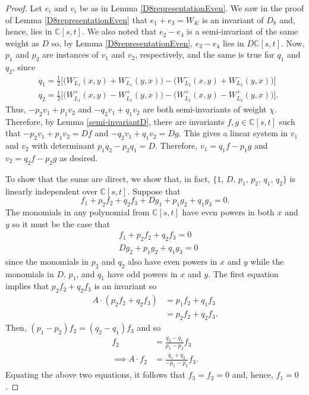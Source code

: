 \documentclass[a4paper,reqno]{amsart}
\theoremstyle{definition}
\theoremstyle{remark} \newtheorem{remark}[theorem]{Remark}
\numberwithin{equation}{section}
\begin{document}
\begin{proof}
    Let \(e_i\) and \(v_i\) be as in Lemma \ref{D8representationEven}. We saw in the proof of Lemma \ref{D8representationEven} that \(e_1 + e_3 = W_K\) is an invariant of \(D_8\) and, hence, lies in \(\mathbb{C}[s,t]\). We also noted that \(e_2 - e_4\) is a semi-invariant of the same weight as \(D\) so, by Lemma \ref{D8representationEven}, \(e_2 - e_4\) lies in \(D\mathbb{C}[s,t]\). Now, \(p_1\) and \(p_2\) are instances of \(v_1\) and \(v_2\), respectively, and the same is true for \(q_1\) and \(q_2\), since
    \begin{align*}
        &q_1 = \frac{1}{2}\biggl[\biggl(W_{L_1}^-(x,y) + W_{L_1}^-(y,x)\biggr) - \biggl(W_{L_2}^-(x,y) + W_{L_2}^-(y,x)\biggr)\biggr] \\
        &q_2 = \frac{1}{2}\biggl[\biggl(W_{L_1}^+(x,y) - W_{L_1}^+(y,x)\biggr) - \biggl(W_{L_2}^+(x,y) - W_{L_2}^+(y,x)\biggr)\biggr].
    \end{align*}
    Thus, \(-p_2v_1 + p_1v_2\) and \(-q_2v_1 + q_1v_2\) are both semi-invariants of weight \(\chi\). Therefore, by Lemma \ref{semi-invariantD}, there are invariants \(f,g \in \mathbb{C}[s,t]\) such that \(-p_2v_1 + p_1v_2 = Df\) and \(-q_2v_1 + q_1v_2 = Dg\). This gives a linear system in \(v_1\) and \(v_2\) with determinant \(p_1q_2 - p_2q_1 = D\). Therefore, \(v_1 = q_1f - p_1g\) and \(v_2 = q_2f - p_2g\) as desired.
    
    To show that the sums are direct, we show that, in fact, \(\{1,\, D,\, p_1,\, p_2,\, q_1,\, q_2\}\) is linearly independent over \(\mathbb{C}[s,t]\). Suppose that 
    \begin{equation*}
        f_1 + p_2f_2 + q_2f_3 + Dg_1 + p_1g_2 + q_1g_3 = 0. 
    \end{equation*}
    The monomials in any polynomial from \(\mathbb{C}[s,t]\) have even powers in both \(x\) and \(y\) so it must be the case that 
    \begin{align*}
        &f_1 + p_2f_2 + q_2f_3 = 0 \\
        &Dg_2 + p_1g_2 + q_1g_3 = 0
    \end{align*}
    since the monomials in \(p_2\) and \(q_2\) also have even powers in \(x\) and \(y\) while the monomials in \(D,\,p_1\), and \(q_1\) have odd powers in \(x\) and \(y\). The first equation implies that \(p_2f_2 + q_2f_3\) is an invariant so
    \begin{align*}
        A \cdot (p_2f_2 + q_2f_3) &= p_1 f_2 + q_1 f_3 \\
        & = p_2f_2 + q_2f_3.
    \end{align*}
    Then, \((p_1 - p_2)f_2 = (q_2 - q_1)f_3\) and so
    \begin{align*}
        f_2 &= \frac{q_2 - q_1}{p_1 - p_2}f_3 \\
        \implies A \cdot f_2 &= \frac{q_1 + q_2}{-p_1 - p_2}f_3.
    \end{align*}
    Equating the above two equations, it follows that \(f_3 = f_2 = 0\) and, hence, \(f_1 = 0\).
    

\end{proof}
\end{document}
